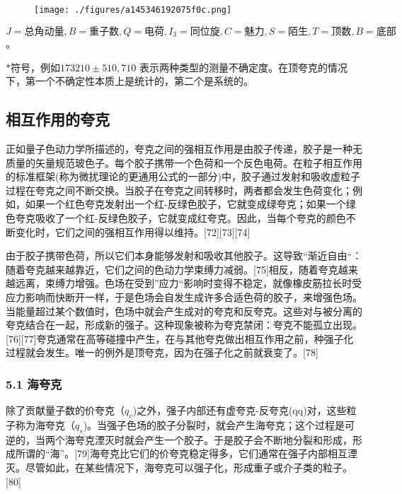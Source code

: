 \begin{figure}[ht]
\centering
\texttt{[image: ./figures/a145346192075f0c.png]}
\caption \label{fig_Quark_11}
\end{figure}
$J = \text{总角动量},B = \text{重子数}, Q = \text{电荷},I_3 = \text{同位旋}, C = \text{魅力},S = \text{陌生}, T = \text{顶数}, B = \text{底部}$。

$\ast \text{符号，例如} 173210 \pm 510 , 710$ 表示两种类型的测量不确定度。在顶夸克的情况下，第一个不确定性本质上是统计的，第二个是系统的。

\subsection{相互作用的夸克}
正如量子色动力学所描述的，夸克之间的强相互作用是由胶子传递，胶子是一种无质量的矢量规范玻色子。每个胶子携带一个色荷和一个反色电荷。在粒子相互作用的标准框架(称为微扰理论的更通用公式的一部分)中，胶子通过发射和吸收虚粒子过程在夸克之间不断交换。当胶子在夸克之间转移时，两者都会发生色荷变化；例如，如果一个红色夸克发射出一个红-反绿色胶子，它就变成绿夸克；如果一个绿色夸克吸收了一个红-反绿色胶子，它就变成红夸克。因此，当每个夸克的颜色不断变化时，它们之间的强相互作用得以维持。[72][73][74]

由于胶子携带色荷，所以它们本身能够发射和吸收其他胶子。这导致“渐近自由“：随着夸克越来越靠近，它们之间的色动力学束缚力减弱。[75]相反，随着夸克越来越远离，束缚力增强。色场在受到”应力“影响时变得不稳定，就像橡皮筋拉长时受应力影响而快断开一样，于是色场会自发生成许多合适色荷的胶子，来增强色场。当能量超过某个数值时，色场中就会产生成对的夸克和反夸克。这些对与被分离的夸克结合在一起，形成新的强子。这种现象被称为夸克禁闭：夸克不能孤立出现。[76][77]夸克通常在高等碰撞中产生，在与其他夸克做出相互作用之前，种强子化过程就会发生。唯一的例外是顶夸克，因为在强子化之前就衰变了。[78]

\subsubsection{5.1 海夸克}
除了贡献量子数的价夸克（$q_v$)之外，强子内部还有虚夸克-反夸克(qq)对，这些粒子称为海夸克（$q_s$)。当强子色场的胶子分裂时，就会产生海夸克；这个过程是可逆的，当两个海夸克湮灭时就会产生一个胶子。于是胶子会不断地分裂和形成，形成所谓的“海”。[79]海夸克比它们的价夸克稳定得多，它们通常在强子内部相互湮灭。尽管如此，在某些情况下，海夸克可以强子化，形成重子或介子类的粒子。[80]

